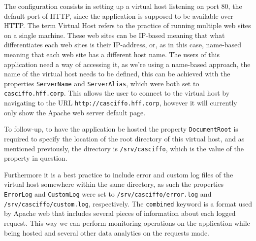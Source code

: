 The configuration consists in setting up a virtual host listening on port 80, the default port of HTTP, since the application is supposed to be available over HTTP. The term Virtual Host refers to the practice of running multiple web sites on a single machine. These web sites can be IP-based meaning that what differentiates each web sites is their IP-address, or, as in this case, name-based meaning that each web site has a different host name. 
The users of this application need a way of accessing it, as we're using a name-based approach, the name of the virtual host needs to be defined, this can be achieved with the properties \lstinline{ServerName} and \lstinline{ServerAlias}, which were both set to \lstinline{casciffo.hff.corp}. This allows the user to connect to the virtual host by navigating to the URL \lstinline[keywordstyle=\color{black},commentstyle=\color{black},stringstyle=\color{black}]{http://casciffo.hff.corp}, however it will currently only show the Apache web server default page.

To follow-up, to have the application be hosted the property \lstinline{DocumentRoot} is required to specify the location of the root directory of this virtual host, and as mentioned previously, the directory is \lstinline[keywordstyle=\color{black},commentstyle=\color{black},stringstyle=\color{black}]{/srv/casciffo}, which is the value of the property in question. 

Furthermore it is a best practice to include error and custom log files of the virtual host somewhere within the same directory, as such the properties \lstinline{ErrorLog} and \lstinline[keywordstyle=\color{black},commentstyle=\color{black},stringstyle=\color{black}]{CustomLog} 
were set to \lstinline[keywordstyle=\color{black},commentstyle=\color{black},stringstyle=\color{black}]{/srv/casciffo/error.log} and \lstinline[keywordstyle=\color{black},commentstyle=\color{black},stringstyle=\color{black}]{/srv/casciffo/custom.log}, respectively. The \lstinline{combined} keyword is a format used by Apache web that includes several pieces of information about each logged request.
This way we can perform monitoring operations on the application while being hosted and several other data analytics on the requests made.

